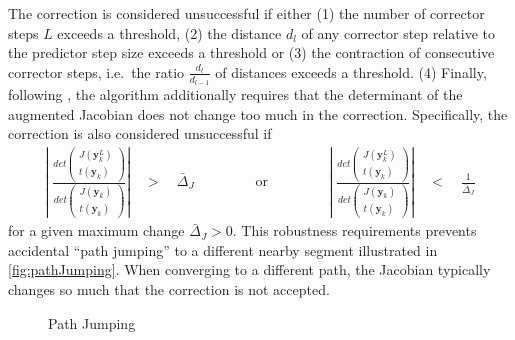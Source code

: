 \documentclass[11pt,fleqn]{article}
\begin{document}
The correction is considered unsuccessful if either (1) the number of corrector steps $L$ exceeds a threshold, (2) the distance $d_l$ of any corrector step relative to the predictor step size exceeds a threshold  or (3) the contraction of consecutive corrector steps, i.e.\ the ratio $\frac{d_l}{d_{l-1}}$ of distances exceeds a threshold. (4) Finally, following \cite{Choietal1996}, the algorithm additionally requires that the determinant of the augmented Jacobian does not change too much in the correction. Specifically, the correction is also considered unsuccessful if
\begin{align*}
	\left| \; \frac{ det \begin{pmatrix} J(\bm{y}_k^L) \\ t(\bm{y}_k) \end{pmatrix} }{ det \begin{pmatrix} J(\bm{y}_k) \\ t(\bm{y}_k) \end{pmatrix} } \right| \quad>\quad \bar{\Delta}_J
	\qquad\qquad\text{ or }\qquad\qquad
	\left| \; \frac{ det \begin{pmatrix} J(\bm{y}_k^L) \\ t(\bm{y}_k) \end{pmatrix} }{ det \begin{pmatrix} J(\bm{y}_k) \\ t(\bm{y}_k) \end{pmatrix} } \right| \quad<\quad \frac{1}{\bar{\Delta}_J}
\end{align*}
for a given maximum change $\bar{\Delta}_J > 0$. This robustness requirements prevents accidental ``path jumping'' to a different nearby segment illustrated in \autoref{fig:pathJumping}. When converging to a different path, the Jacobian typically changes so much that the correction is not accepted.


\begin{figure}[tbh]
\vspace{1em}
\caption{Path Jumping}
\label{fig:pathJumping}
\begin{center}
\end{center}
\vspace{1em}
\end{figure}
\end{document}
